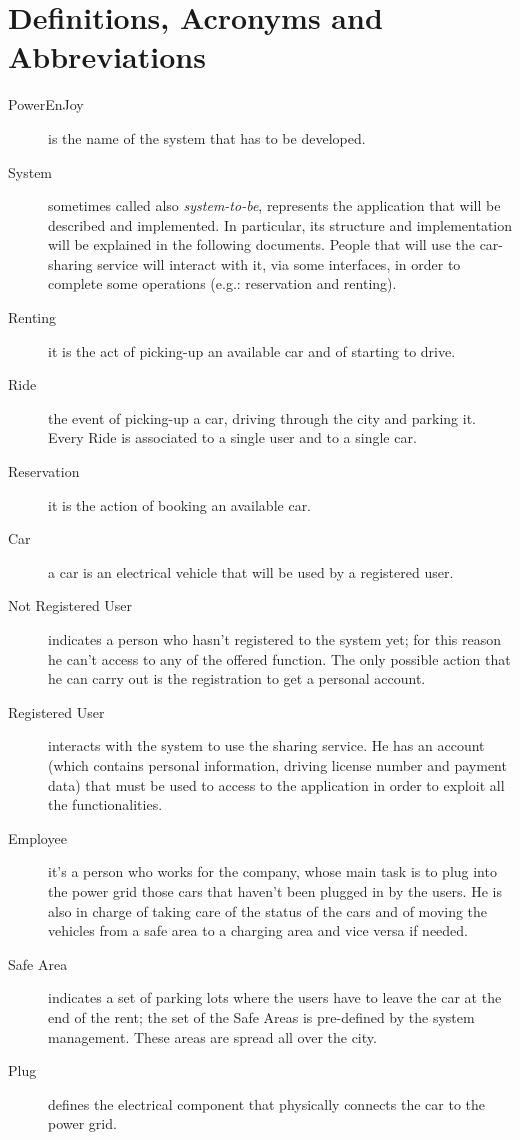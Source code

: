 \documentclass[11pt,a4paper]{report}
\begin{document}
\section{Definitions, Acronyms and Abbreviations}
\begin{description}
\item[PowerEnJoy]is the name of the system that has to be developed.
\item[System]sometimes called also \textit{system-to-be}, represents the application that will be described and implemented.
In particular, its structure and implementation will be explained in the following documents. People that will use the car-sharing service will interact with it, via some interfaces, in order to complete some operations (e.g.: reservation and renting).
\item[Renting]it is the act of picking-up an available car and of starting to drive.
\item[Ride] the event of picking-up a car, driving through the city and parking it. Every Ride is associated to a single user and to a single car.
\item[Reservation]it is the action of booking an available car.
\item[Car] a car is an electrical vehicle that will be used by a registered user.
\item[Not Registered User] indicates a person who hasn't registered to the system yet; for this reason he can't access to any of the offered function. The only possible action that he can carry out is the registration to get a personal account.
\item[Registered User] interacts with the system to use the sharing service. He has an account (which contains personal information, driving license number and payment data) that must be used to access to the application in order to exploit all the functionalities.
\item[Employee] it's a person who works for the company, whose main task is to plug into the power grid those cars that haven't been plugged in by the users. He is also in charge of taking care of the status of the cars and of moving the vehicles from a safe area to a charging area and vice versa if needed.
\item[Safe Area] indicates a set of parking lots where the users have to leave the car at the end of the rent; the set of the Safe Areas is pre-defined by the system management. These areas are spread all over the city.
\item[Plug] defines the electrical component that physically connects the car to the power grid.

\end{description}
\end{document}
